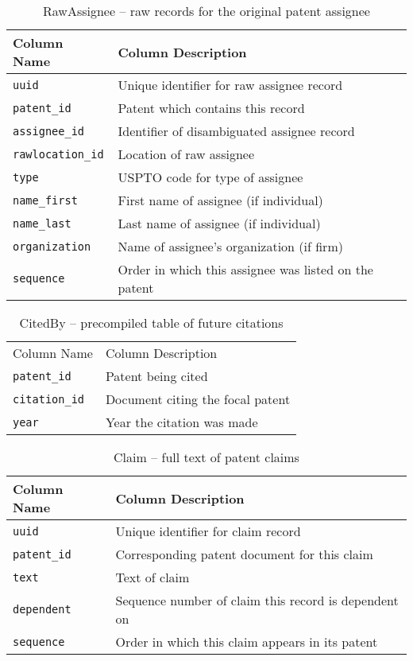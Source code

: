\begin{table}[ht]
\center
\begin{tabular}{| l | l |}
\hline
Column Name & Column Description \\
\hline
\verb`uuid` & Unique identifier for raw assignee record \\
\verb`patent_id` & Patent which contains this record \\
\verb`assignee_id` & Identifier of disambiguated assignee record \\
\verb`rawlocation_id` & Location of raw assignee \\
\verb`type` & USPTO code for type of assignee \\
\verb`name_first` & First name of assignee (if individual) \\
\verb`name_last` & Last name of assignee (if individual) \\
\verb`organization` & Name of assignee's organization (if firm) \\
\verb`sequence` & Order in which this assignee was listed on the patent \\
\hline
\end{tabular}
\caption{RawAssignee -- raw records for the original patent assignee}
\end{table}


\begin{table}[ht]
\center
\begin{tabular}{| l | l |}
\hline
Column Name & Column Description \\
\verb`patent_id` & Patent being cited \\
\verb`citation_id` & Document citing the focal patent \\
\verb`year` & Year the citation was made \\
\hline
\hline
\end{tabular}
\caption{CitedBy -- precompiled table of future citations}
\end{table}

\begin{table}[ht]
\center
\begin{tabular}{| l | l |}
\hline
Column Name & Column Description \\
\hline
\verb`uuid` & Unique identifier for claim record \\
\verb`patent_id` & Corresponding patent document for this claim \\
\verb`text` & Text of claim \\
\verb`dependent` & Sequence number of claim this record is dependent on \\
\verb`sequence` & Order in which this claim appears in its patent \\
\hline
\end{tabular}
\caption{Claim -- full text of patent claims}
\end{table}

